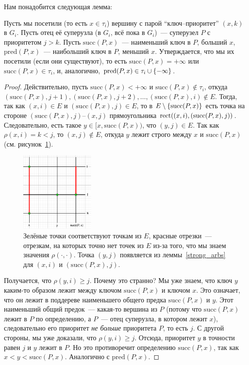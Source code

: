 Нам понадобится следующая лемма:

\begin{lemma}\label{visited_parent}
	Пусть мы посетили (то есть $x \in \tau_i$) вершину с парой ``ключ--приоритет'' $(x, k)$ в $G_i$. Пусть отец её суперузла (в $G_i$, всё пока в $G_i$)~--- суперузел $P$ с приоритетом $j > k$.
	Пусть $\mathrm{succ}(P, x)$~--- наименьший ключ в $P$, больший $x$, $\mathrm{pred}(P, x)$~--- наибольший ключ в $P$, меньший $x$.
	Утверждается, что мы их посетили (если они существуют), то есть $\mathrm{succ}(P, x) = +\infty$ или $\mathrm{succ}(P, x) \in \tau_i$, и, аналогично, $\mathrm{pred}(P, x) \in \tau_i \cup \lbrace-\infty\rbrace$.
\end{lemma}
\begin{proof}
	Действительно, пусть $\mathrm{succ}(P, x) < +\infty$ и $\mathrm{succ}(P, x) \notin \tau_i$, откуда $(\mathrm{succ}(P, x), j + 1), (\mathrm{succ}(P, x), j + 2), \ldots, (\mathrm{succ}(P, x), i) \notin E$. Тогда, так как $(x, i) \in E$ и $(\mathrm{succ}(P, x), j) \in E$, то в $E \setminus \lbrace\mathrm{succ}(P, x)\rbrace$ есть точка на стороне $(\mathrm{succ}(P, x), j)$--$(x,j)$ прямоугольника $\operatorname{rect}((x, i), (\mathrm{succ}(P, x), j))$. Следовательно, есть такое $y \in [x, \mathrm{succ}(P, x))$, что $(y, j) \in E$. Так как $\rho(x, i) = k < j$, то $(x, j) \notin E$, откуда $y$ лежит строго между $x$ и $\mathrm{succ}(P, x)$ (см. рисунок~\ref{proof_diagram}).

	\begin{figure}
		\includegraphics[height=4cm]{img/lemma_proof_diagram.png}

		\caption{Зелёные точки соответствуют точкам из $E$, красные отрезки~--- отрезкам, на которых точно нет точек из $E$ из-за того, что мы знаем значения
			$\rho(\cdot, \cdot)$. Точка $(y, j)$ появляется из леммы~\ref{strong_arbs} для $(x, i)$ и
			$(\mathrm{succ}(P, x), j)$.}
		\label{proof_diagram}
	\end{figure}

	Получается, что $\rho(y, i) \geqslant j$. Почему это странно? Мы уже знаем, что ключ $y$ каким-то образом лежит между ключом $\mathrm{succ}(P, x)$ и ключом $x$. Это означает, что он лежит в поддереве наименьшего общего предка
	$\mathrm{succ}(P, x)$ и $y$. Этот наименьший общий предок~--- какая-то вершина из $P$ (потому что $\mathrm{succ}(P, x)$ лежит в $P$ по определению, а $P$~--- отец суперузла, в котором лежит $x$), следовательно его приоритет \emph{не больше} приоритета $P$, то есть $j$. С другой стороны, мы уже доказали, что $\rho(y, i) \geqslant j$. Отсюда, приоритет $y$ в точности равен $j$ и $y$ лежит в $P$. Но это противоречит определению $\mathrm{succ}(P, x)$, так как $x < y < \mathrm{succ}(P, x)$. Аналогично с $\mathrm{pred}(P, x)$.

\end{proof}


